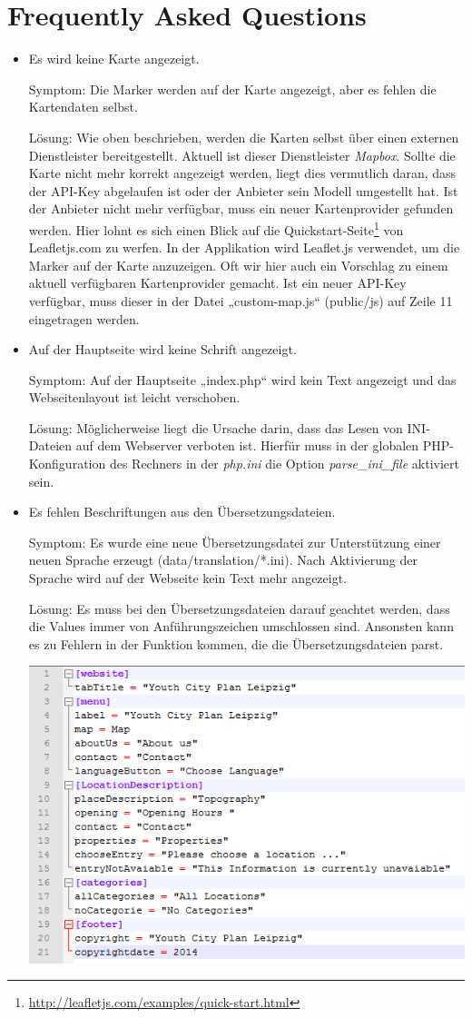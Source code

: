 \documentclass[11pt,a4paper]{article}
\begin{document}
\section{Frequently Asked Questions}
\begin{itemize}
\item Es wird keine Karte angezeigt.

  Symptom: Die Marker werden auf der Karte angezeigt, aber es fehlen die
  Kartendaten selbst.  

  Lösung: Wie oben beschrieben, werden die Karten selbst über einen externen
  Dienstleister bereitgestellt. Aktuell ist dieser Dienstleister \emph{Mapbox}.
  Sollte die Karte nicht mehr korrekt angezeigt werden, liegt dies vermutlich
  daran, dass der API-Key abgelaufen ist oder der Anbieter sein Modell
  umgestellt hat. Ist der Anbieter nicht mehr verfügbar, muss ein neuer
  Kartenprovider gefunden werden. Hier lohnt es sich einen Blick auf die
  Quickstart-Seite\footnote{\url{http://leafletjs.com/examples/quick-start.html}}
  von Leafletjs.com zu werfen. In der Applikation wird Leaflet.js verwendet, um
  die Marker auf der Karte anzuzeigen. Oft wir hier auch ein Vorschlag zu einem
  aktuell verfügbaren Kartenprovider gemacht. Ist ein neuer API-Key verfügbar,
  muss dieser in der Datei „custom-map.js“ (public/js) auf Zeile 11 eingetragen
  werden.
\item Auf der Hauptseite wird keine Schrift angezeigt.

  Symptom: Auf der Hauptseite „index.php“ wird kein Text angezeigt und das
  Webseitenlayout ist leicht verschoben.

  Lösung: Möglicherweise liegt die Ursache darin, dass das Lesen von
  INI-Dateien auf dem Webserver verboten ist. Hierfür muss in der globalen
  PHP-Konfiguration des Rechners in der \emph{php.ini} die Option
  \emph{parse\_ini\_file} aktiviert sein.
\item Es fehlen Beschriftungen aus den Übersetzungsdateien.

  Symptom: Es wurde eine neue Übersetzungsdatei zur Unterstützung einer neuen
  Sprache erzeugt (data/translation/*.ini). Nach Aktivierung der Sprache wird
  auf der Webseite kein Text mehr angezeigt.

  Lösung: Es muss bei den Übersetzungsdateien darauf geachtet werden, dass die
  Values immer von Anführungszeichen umschlossen sind. Ansonsten kann es zu
  Fehlern in der Funktion kommen, die die Übersetzungsdateien parst.
  \begin{center}
    \includegraphics[width=.6\textwidth]{Screenshot.png}
  \end{center}
\end{itemize}
\end{document}
